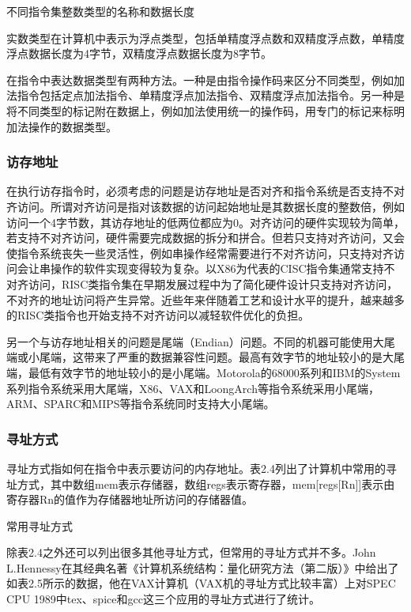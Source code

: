 \documentclass[]{ctexbook}
\begin{document}
\label{tab:int-type}不同指令集整数类型的名称和数据长度

实数类型在计算机中表示为浮点类型，包括单精度浮点数和双精度浮点数，单精度浮点数据长度为4字节，双精度浮点数据长度为8字节。

在指令中表达数据类型有两种方法。一种是由指令操作码来区分不同类型，例如加法指令包括定点加法指令、单精度浮点加法指令、双精度浮点加法指令。另一种是将不同类型的标记附在数据上，例如加法使用统一的操作码，用专门的标记来标明加法操作的数据类型。

\hypertarget{ux8bbfux5b58ux5730ux5740}{%
\subsubsection{访存地址}\label{ux8bbfux5b58ux5730ux5740}}

在执行访存指令时，必须考虑的问题是访存地址是否对齐和指令系统是否支持不对齐访问。所谓对齐访问是指对该数据的访问起始地址是其数据长度的整数倍，例如访问一个4字节数，其访存地址的低两位都应为0。对齐访问的硬件实现较为简单，若支持不对齐访问，硬件需要完成数据的拆分和拼合。但若只支持对齐访问，又会使指令系统丧失一些灵活性，例如串操作经常需要进行不对齐访问，只支持对齐访问会让串操作的软件实现变得较为复杂。以X86为代表的CISC指令集通常支持不对齐访问，RISC类指令集在早期发展过程中为了简化硬件设计只支持对齐访问，不对齐的地址访问将产生异常。近些年来伴随着工艺和设计水平的提升，越来越多的RISC类指令也开始支持不对齐访问以减轻软件优化的负担。

另一个与访存地址相关的问题是尾端（Endian）问题。不同的机器可能使用大尾端或小尾端，这带来了严重的数据兼容性问题。最高有效字节的地址较小的是大尾端，最低有效字节的地址较小的是小尾端。Motorola的68000系列和IBM的System系列指令系统采用大尾端，X86、VAX和LoongArch等指令系统采用小尾端，ARM、SPARC和MIPS等指令系统同时支持大小尾端。

\hypertarget{ux5bfbux5740ux65b9ux5f0f}{%
\subsubsection{寻址方式}\label{ux5bfbux5740ux65b9ux5f0f}}

寻址方式指如何在指令中表示要访问的内存地址。表2.4列出了计算机中常用的寻址方式，其中数组mem表示存储器，数组regs表示寄存器，mem{[}regs{[}Rn{]}{]}表示由寄存器Rn的值作为存储器地址所访问的存储器值。

\label{tab:addressing}常用寻址方式

除表2.4之外还可以列出很多其他寻址方式，但常用的寻址方式并不多。John L.Hennessy在其经典名著《计算机系统结构：量化研究方法（第二版）》中给出了如表2.5所示的数据，他在VAX计算机（VAX机的寻址方式比较丰富）上对SPEC CPU 1989中tex、spice和gcc这三个应用的寻址方式进行了统计。
\end{document}
